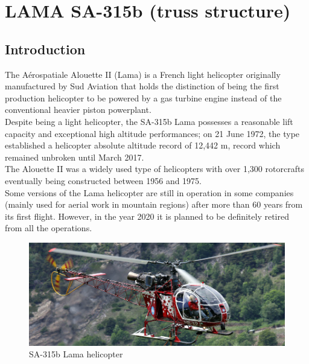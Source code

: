 \chapter{LAMA SA-315b (truss structure)}

\section*{Introduction}
\noindent
 The Aérospatiale Alouette II (Lama) is a French light helicopter originally manufactured by Sud Aviation that holds the distinction of being the first production helicopter to be powered by a gas turbine engine instead of the conventional heavier piston powerplant. \\
Despite being a light helicopter, the SA-315b Lama possesses a reasonable lift capacity and exceptional high altitude performances; on 21 June 1972, the type established a helicopter absolute altitude record of 12,442 m, record which remained unbroken until March 2017. \\
The Alouette II was a widely used type of helicopters with over 1,300 rotorcrafts eventually being constructed between 1956 and 1975. \\
Some versions of the Lama helicopter are still in operation in some companies (mainly used for aerial work in mountain regions) after more than 60 years from its first flight. However, in the year 2020 it is planned to be definitely retired from all the operations.

\medskip
\begin{figure}[h]
	\begin{center}
		\centering  		 		
		\includegraphics[width=0.95\linewidth]{PICTURES/2_Lama_truss/PNG/lama1.png}
	\end{center}
	\caption {SA-315b Lama helicopter}
\end{figure}



